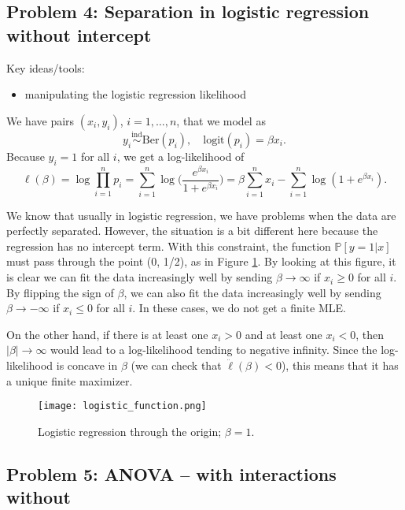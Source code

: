 \subsection*{Problem 4: Separation in logistic regression without intercept}

Key ideas/tools:
\begin{itemize}
\item manipulating the logistic regression likelihood
\end{itemize}


We have pairs $(x_i, y_i)$, $i = 1, \dots, n$, that we model as
\begin{equation}
y_i \overset{\text{ind}}\sim \text{Ber}(p_i), \quad \text{logit}(p_i) = \beta x_i.
\end{equation}
Because $y_i = 1$ for all $i$, we get a log-likelihood of
\begin{equation}
\ell(\beta) = \log \prod_{i=1}^n p_i = \sum_{i=1}^n \log \Big(  \frac{e^{\beta x_i}}{1+e^{\beta x_i}}\Big)= \beta \sum_{i = 1}^n x_i - \sum_{i = 1}^n \log(1 + e^{\beta x_i}).
\label{logistic_likelihood}
\end{equation}

We know that usually in logistic regression, we have problems when the data are perfectly separated. However, the situation is a bit different here because the regression has no intercept term. With this constraint, the function $\mathbb P[y = 1|x]$ must pass through the point (0, 1/2), as in Figure \ref{fig:logistic}. By looking at this figure, it is clear we can fit the data increasingly well by sending $\beta \rightarrow \infty$ if $x_i \geq 0$ for all $i$. By flipping the sign of $\beta$, we can also fit the data increasingly well by sending $\beta \rightarrow -\infty$ if $x_i \leq 0$ for all $i$. In these cases, we do not get a finite MLE.

On the other hand, if there is at least one $x_i > 0$ and at least one $x_i < 0$, then $|\beta| \rightarrow \infty$ would lead to a log-likelihood tending to negative infinity. Since the log-likelihood is concave in $\beta$ (we can check that $\ddot{\ell}(\beta) <0$), this means that it has a unique finite maximizer.
\begin{figure}
	\centering
	\texttt{[image: logistic\_function.png]}
	\caption{Logistic regression through the origin; $\beta = 1$.}
	\label{fig:logistic}
\end{figure}


\subsection*{Problem 5: ANOVA -- with interactions without}

